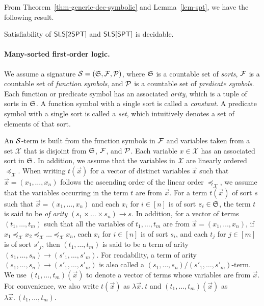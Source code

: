 From Theorem~\ref{thm-generic-dec-symbolic} and Lemma~\ref{lem-spt}, we have the following result.
\begin{theorem}
Satisfiability of $\textsf{SLS}[\textsf{2SPT}]$ and $\textsf{SLS}[\textsf{SPT}]$ is decidable.
\end{theorem}




\hide
{

\paragraph{Many-sorted first-order logic.}
We assume a signature $\mathcal{S}=({\mathfrak{S}}, {\mathcal{F}}, {\mathcal{P}})$, where ${\mathfrak{S}}$ is a countable set of \emph{sorts}, ${\mathcal{F}}$ is a countable set of \emph{function symbols}, and ${\mathcal{P}}$ is a countable set of \emph{predicate symbols}. Each function or predicate symbol has an associated \emph{arity}, which is a tuple of sorts in ${\mathfrak{S}}$.  A function symbol with a single sort is called a \emph{constant}. A predicate symbol with a single sort is called a \emph{set}, which intuitively denotes a set of elements of that sort.

An $\mathcal{S}$-term is built from the function symbols in ${\mathcal{F}}$ and variables taken from a set $\mathcal{X}$ that is disjoint from ${\mathfrak{S}}$, ${\mathcal{F}}$, and ${\mathcal{P}}$. Each variable $x \in \mathcal{X}$ has an associated sort in ${\mathfrak{S}}$. In addition, we assume that the variables in $\mathcal{X}$ are linearly ordered $\preceq_{\mathcal{X}}$. When writing $t(\vec{x})$ for a vector of distinct variables $\vec{x}$ such that $\vec{x} = (x_1,\dots, x_n)$ follows the ascending order of the linear order $\preceq_{\mathcal{X}}$, we assume that the variables occurring in the term $t$ are from $\vec{x}$. For a term $t(\vec{x})$ of sort $s$ such that $\vec{x} = (x_1, \dots, x_n)$ and each $x_i$ for $i \in [n]$ is of sort $s_i \in {\mathfrak{S}}$, the term $t$ is said to be \emph{of arity} $(s_1 \times \dots \times s_n) \rightarrow s$. In addition, for a vector of terms $(t_1, \dots, t_m)$ such that all the variables of $t_1 ,\dots, t_m$ are from $\vec{x} = (x_1, \dots, x_n)$, if $x_1 \preceq_{\mathcal{X}} x_2  \preceq_{\mathcal{X}} \dots  \preceq_{\mathcal{X}} x_n$, each $x_i$ for $i \in [n]$ is of sort $s_i$, and each $t_j$ for $j \in [m]$ is of sort $s'_j$, then $(t_1,\dots, t_m)$ is said to be a term of arity $(s_1,\dots, s_n) \rightarrow (s'_1,\dots, s'_m)$. For readability, a term of arity $(s_1,\dots, s_n) \rightarrow (s'_1,\dots, s'_m)$ is also called a $(s_1,\dots, s_n) \big/ (s'_1,\dots, s'_m)$-term. We use $(t_1,\dots, t_m)(\vec{x})$ to denote a vector of terms whose variables are from $\vec{x}$.  For convenience, we also write $t(\vec{x})$ as $\lambda \vec{x}.\ t$ and $(t_1,\dots, t_m)(\vec{x})$ as $\lambda \vec{x}.\ (t_1,\dots, t_m)$. 

}
